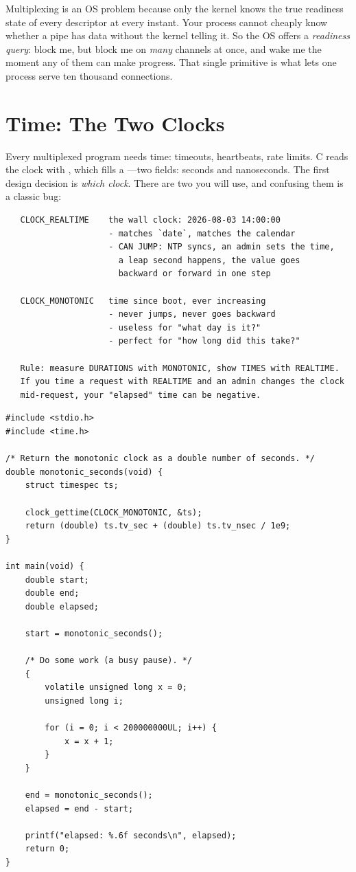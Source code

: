 \begin{osconcept}
Multiplexing is an OS problem because only the kernel knows the true
readiness state of every descriptor at every instant. Your process
cannot cheaply know whether a pipe has data without the kernel telling
it. So the OS offers a \emph{readiness query}: block me, but block me
on \emph{many} channels at once, and wake me the moment any of them
can make progress. That single primitive is what lets one process serve
ten thousand connections.
\end{osconcept}

\section{Time: The Two Clocks}

Every multiplexed program needs time: timeouts, heartbeats, rate
limits. C reads the clock with , which fills a
---two fields: seconds and nanoseconds. The
first design decision is \emph{which clock}. There are two you will
use, and confusing them is a classic bug:

\begin{verbatim}
   CLOCK_REALTIME    the wall clock: 2026-08-03 14:00:00
                     - matches `date`, matches the calendar
                     - CAN JUMP: NTP syncs, an admin sets the time,
                       a leap second happens, the value goes
                       backward or forward in one step

   CLOCK_MONOTONIC   time since boot, ever increasing
                     - never jumps, never goes backward
                     - useless for "what day is it?"
                     - perfect for "how long did this take?"

   Rule: measure DURATIONS with MONOTONIC, show TIMES with REALTIME.
   If you time a request with REALTIME and an admin changes the clock
   mid-request, your "elapsed" time can be negative.
\end{verbatim}

\begin{lstlisting}[caption={Timing an interval with the monotonic clock.}]
#include <stdio.h>
#include <time.h>

/* Return the monotonic clock as a double number of seconds. */
double monotonic_seconds(void) {
    struct timespec ts;

    clock_gettime(CLOCK_MONOTONIC, &ts);
    return (double) ts.tv_sec + (double) ts.tv_nsec / 1e9;
}

int main(void) {
    double start;
    double end;
    double elapsed;

    start = monotonic_seconds();

    /* Do some work (a busy pause). */
    {
        volatile unsigned long x = 0;
        unsigned long i;

        for (i = 0; i < 200000000UL; i++) {
            x = x + 1;
        }
    }

    end = monotonic_seconds();
    elapsed = end - start;

    printf("elapsed: %.6f seconds\n", elapsed);
    return 0;
}
\end{lstlisting}

